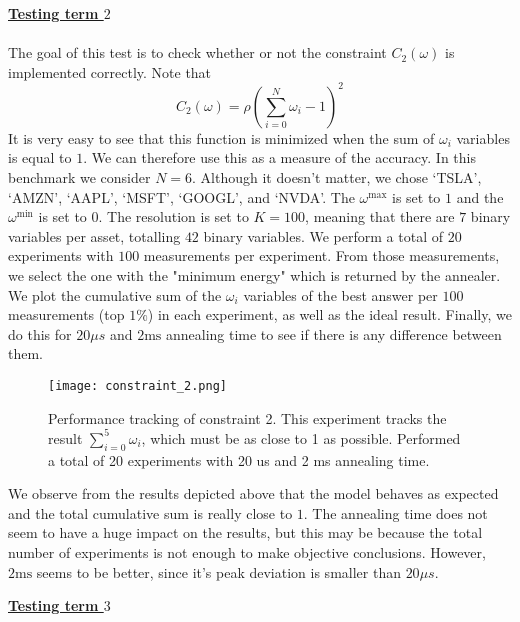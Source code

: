 \documentclass[12pt,a4paper]{report}
\begin{document}
\newpage
\noindent
\textbf{\underline{Testing term $2$}}
\\~\\

\noindent
The goal of this test is to check whether or not the constraint \(C_2(\omega)\) is implemented correctly. Note that 
\[ C_2(\omega) = \rho \left( \sum_{i=0}^{N} \omega_i - 1 \right)^2 \]
\noindent
It is very easy to see that this function is minimized when the sum of \(\omega_i\) variables is equal to \(1\). We can therefore use this as a measure of the accuracy. In this benchmark we consider \(N=6\). Although it doesn't matter, we chose `TSLA', `AMZN', `AAPL', `MSFT', `GOOGL', and `NVDA'. The \(\omega^{\text{max}}\) is set to \(1\) and the \(\omega^{\text{min}}\) is set to \(0\). The resolution is set to \(K=100\), meaning that there are \(7\) binary variables per asset, totalling \(42\) binary variables. We perform a total of \(20\) experiments with \(100\) measurements per experiment. From those measurements, we select the one with the "minimum energy" which is returned by the annealer. We plot the cumulative sum of the \(\omega_i\) variables of the best answer per \(100\) measurements (top \(1\%\)) in each experiment, as well as the ideal result. Finally, we do this for \(20 \mu s\) and \(2 \text{ms}\) annealing time to see if there is any difference between them.


\begin{figure}[!h]
    \centering
    \texttt{[image: constraint\_2.png]} 
    \caption{Performance tracking of constraint 2. This experiment tracks the result \(\sum_{i=0}^{5} \omega_i\), which must be as close to 1 as possible. Performed a total of 20 experiments with 20 us and 2 ms annealing time.}
    \label{fig:constr_2}
\end{figure}

\noindent
We observe from the results depicted above that the model behaves as expected and the total cumulative sum is really close to \(1\). The annealing time does not seem to have a huge impact on the results, but this may be because the total number of experiments is not enough to make objective conclusions. However, \(2 \text{ms}\) seems to be better, since it's peak deviation is smaller than \(20 \mu s\).
\newpage

\noindent
\textbf{\underline{Testing term $3$}}
\\~\\
\end{document}
